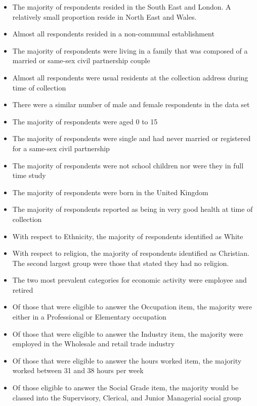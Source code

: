 \documentclass[]{book}
\providecommand{\tightlist}{%
  \setlength{\itemsep}{0pt}\setlength{\parskip}{0pt}}
\begin{document}
\begin{itemize}
\tightlist
\item
  The majority of respondents resided in the South East and London. A
  relatively small proportion reside in North East and Wales.\\
\item
  Almost all respondents resided in a non-communal establishment\\
\item
  The majority of respondents were living in a family that was composed
  of a married or same-sex civil partnership couple\\
\item
  Almost all respondents were usual residents at the collection address
  during time of collection\\
\item
  There were a similar number of male and female respondents in the data
  set\\
\item
  The majority of respondents were aged 0 to 15\\
\item
  The majority of respondents were single and had never married or
  registered for a same-sex civil partnership
\item
  The majority of respondents were not school children nor were they in
  full time study
\item
  The majority of respondents were born in the United Kingdom\\
\item
  The majority of respondents reported as being in very good health at
  time of collection
\item
  With respect to Ethnicity, the majority of respondents identified as
  White\\
\item
  With respect to religion, the majority of respondents identified as
  Christian. The second largest group were those that stated they had no
  religion.\\
\item
  The two most prevalent categories for economic activity were employee
  and retired\\
\item
  Of those that were eligible to answer the Occupation item, the
  majority were either in a Professional or Elementary occupation\\
\item
  Of those that were eligible to answer the Industry item, the majority
  were employed in the Wholesale and retail trade industry\\
\item
  Of those that were eligible to answer the hours worked item, the
  majority worked between 31 and 38 hours per week\\
\item
  Of those eligible to answer the Social Grade item, the majority would
  be classed into the Supervisory, Clerical, and Junior Managerial
  social group
\end{itemize}
\end{document}
